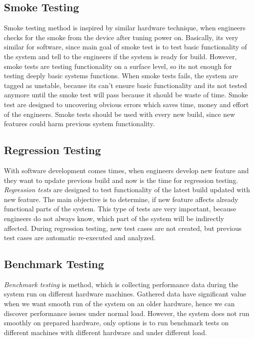 \subsection*{Smoke Testing}
Smoke testing method is inspired by similar hardware technique, when engineers checks for the smoke from the device after tuning power on. Basically, its very similar for software, since main goal of smoke test is to test basic functionality of the system and tell to the engineers if the system is ready for build. However, smoke tests are testing functionality on a surface level, so its not enough for testing deeply basic systems functions. When smoke tests fails, the system are tagged as unstable, because its can't ensure basic functionality and its not tested anymore until the smoke test will pass because it should be waste of time. Smoke test are designed to uncovering obvious errors which saves time, money and effort of the engineers. Smoke tests should be used with every new build, since new features could harm previous system functionality. 


\subsection*{Regression Testing}
With software development comes times, when engineers develop new feature and they want to update previous build and now is the time for regression testing. \emph{Regression tests} \cite{STF:REGRESSION} are designed to test functionality of the latest build updated with new feature. The main objective is to determine, if new feature affects already functional parts of the system. This type of tests are very important, because engineers do not always know, which part of the system will be indirectly affected. During regression testing, new test cases are not created, but previous test cases are automatic re-executed and analyzed. 


\subsection*{Benchmark Testing}
\emph{Benchmark testing} \cite{Aho:Benchmarking} is method, which is collecting performance data during the system run on different hardware machines. Gathered data have significant value when we want smooth run of the system on an older hardware, hence we can discover performance issues under normal load. However, the system does not run smoothly on prepared hardware, only options is to run benchmark tests on different machines with different hardware and under different load.

